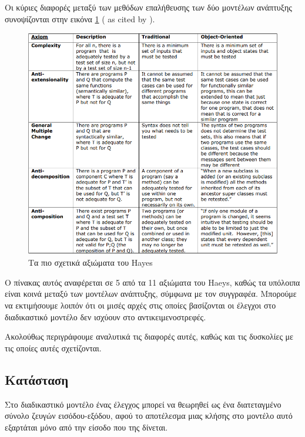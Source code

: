 \documentclass[12pt]{article}
\begin{document}
Οι κύριες διαφορές μεταξύ των μεθόδων επαλήθευσης των δύο μοντέλων ανάπτυξης συνοψίζονται στην εικόνα \ref{fig:hayes_table} (\textcite{hayes} as cited by \textcite{gordon}).

\begin{figure}
\label{fig:hayes_table}
\caption{Τα πιο σχετικά αξιώματα του Hayes}
\includegraphics[width=\textwidth,height=\textheight,keepaspectratio]{hayes_table.PNG}
\end{figure}

\par Ο πίνακας αυτός αναφέρεται σε 5 από τα 11 αξιώματα του Haeys, καθώς τα υπόλοιπα είναι κοινά μεταξύ των μοντέλων ανάπτυξης, σύμφωνα με τον συγγραφέα. Μπορούμε να εκτιμήσουμε λοιπόν ότι οι μισές αρχές στις οποίες βασίζονται οι έλεγχοι στο διαδικαστικό μοντέλο δεν ισχύουν στο αντικειμενοστρεφές.

\par Ακολούθως περιγράφουμε αναλυτικά τις διαφορές αυτές, καθώς και τις δυσκολίες με τις οποίες αυτές σχετίζονται.

\subsection{Κατάσταση}

Στο διαδικαστικό μοντέλο ένας έλεγχος μπορεί να θεωρηθεί ως ένα διατεταγμένο σύνολο ζευγών εισόδου-εξόδου, αφού το αποτέλεσμα μιας κλήσης στο μοντέλο αυτό εξαρτάται μόνο από την είσοδο που της δίνεται.
\end{document}
